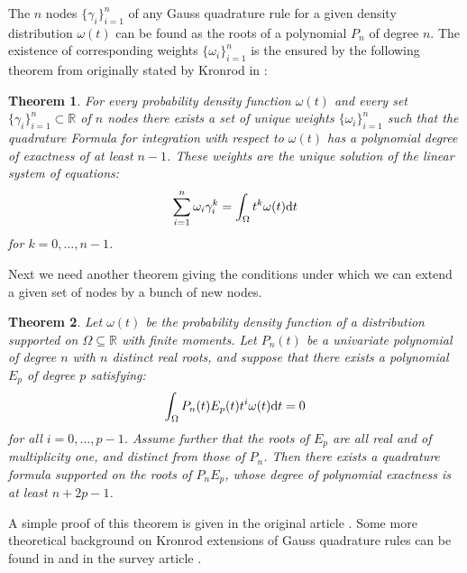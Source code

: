 \documentclass[a4paper,10pt]{article}
\newtheorem{theorem}{Theorem}
\begin{document}
The $n$ nodes $\{\gamma_i\}_{i=1}^{n}$ of any Gauss quadrature rule for a
given density distribution $\omega(t)$ can be found as the roots of a
polynomial $P_n$ of degree $n$. The existence of corresponding weights
$\{\omega_i\}_{i=1}^{n}$ is the ensured by the following theorem from
\cite{mehrotra-papp} originally stated by Kronrod in \cite{kronrod}:

\begin{theorem}
  \label{th:existence_weights}
  For every probability density function $\omega(t)$ and every set
  $\{\gamma_i\}_{i=1}^{n} \subset \mathbb{R}$ of $n$ nodes there exists
  a set of unique weights $\{\omega_i\}_{i=1}^{n}$ such that the quadrature
  Formula for integration with respect to $\omega(t)$ has a polynomial
  degree of exactness of at least $n-1$. These weights are the unique solution
  of the linear system of equations:
  \begin{equation}
    \label{eq:linsys_for_weights}
    \sum_{i=1}^n \omega_i \gamma_i^k = \int_{\Omega} t^k \omega(t) \mathrm{d}t
  \end{equation}
  for $k = 0, \ldots, n-1$.
\end{theorem}

Next we need another theorem giving the conditions under which we can
extend a given set of nodes by a bunch of new nodes.

\begin{theorem}
  \label{th:defining_extension}
  Let $\omega(t)$ be the probability density function of a distribution
  supported on $\Omega \subseteq \mathbb{R}$ with finite moments. Let $P_n(t)$
  be a univariate polynomial of degree $n$ with $n$ distinct real roots,
  and suppose that there exists a polynomial $E_p$ of degree $p$ satisfying:
  \begin{equation}
    \label{eq:defining_extension}
    \int_\Omega P_n(t) E_p(t) t^i \omega(t) \mathrm{d}t = 0
  \end{equation}
  for all $i = 0, \ldots, p-1$. Assume further that the roots of $E_p$
  are all real and of multiplicity one, and distinct from
  those of $P_n$. Then there exists a quadrature formula supported on the
  roots of $P_n E_p$, whose degree of polynomial exactness is at least
  $n + 2p -1$.
\end{theorem}

A simple proof of this theorem is given in the original article \cite{mehrotra-papp}.
Some more theoretical background on Kronrod extensions of Gauss quadrature rules
can be found in \cite{gautschi-rivlin, monegato1978_3} and in the survey article
\cite{monegato1982}.
\end{document}
